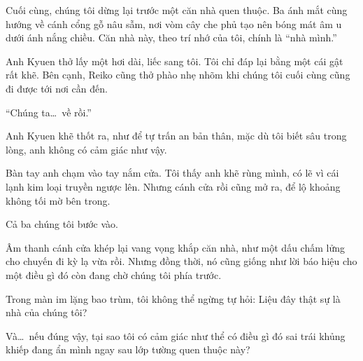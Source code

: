 \documentclass[../main.tex]{subfiles}
\begin{document}
Cuối cùng, chúng tôi dừng lại trước một căn nhà quen thuộc. Ba ánh mắt cùng hướng về cánh cổng gỗ nâu sẫm, nơi vòm cây che phủ tạo nên bóng mát âm u dưới ánh nắng chiều. Căn nhà này, theo trí nhớ của tôi, chính là ``nhà mình.''

Anh Kyuen thở lấy một hơi dài, liếc sang tôi. Tôi chỉ đáp lại bằng một cái gật rất khẽ. Bên cạnh, Reiko cũng thở phào nhẹ nhõm khi chúng tôi cuối cùng cũng đi được tới nơi cần đến.

``Chúng ta\dots\ về rồi.''

Anh Kyuen khẽ thốt ra, như để tự trấn an bản thân, mặc dù tôi biết sâu trong lòng, anh không có cảm giác như vậy.

Bàn tay anh chạm vào tay nắm cửa. Tôi thấy anh khẽ rùng mình, có lẽ vì cái lạnh kim loại truyền ngược lên. Nhưng cánh cửa rồi cũng mở ra, để lộ khoảng không tối mờ bên trong.

Cả ba chúng tôi bước vào.

Âm thanh cánh cửa khép lại vang vọng khắp căn nhà, như một dấu chấm lửng cho chuyến đi kỳ lạ vừa rồi. Nhưng đồng thời, nó cũng giống như lời báo hiệu cho một điều gì đó còn đang chờ chúng tôi phía trước.

Trong màn im lặng bao trùm, tôi không thể ngừng tự hỏi: Liệu đây thật sự là nhà của chúng tôi?

Và\dots\ nếu đúng vậy, tại sao tôi có cảm giác như thể có điều gì đó sai trái khủng khiếp đang ẩn mình ngay sau lớp tường quen thuộc này?
\end{document}
